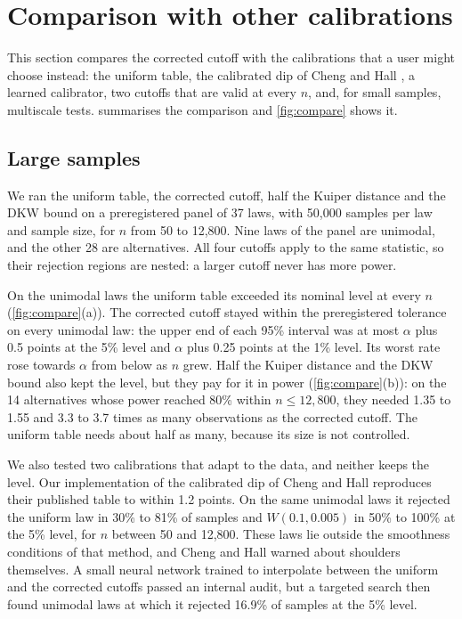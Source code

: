 \section{Comparison with other calibrations}\label{sec:practice}

This section compares the corrected cutoff with the calibrations that a user might choose instead: the uniform table, the calibrated dip of Cheng and Hall \cite{CH98}, a learned calibrator, two cutoffs that are valid at every $n$, and, for small samples, multiscale tests.  summarises the comparison and \cref{fig:compare} shows it.

\subsection{Large samples}
We ran the uniform table, the corrected cutoff, half the Kuiper distance and the DKW bound on a preregistered panel of 37 laws, with 50,000 samples per law and sample size, for $n$ from 50 to 12,800. Nine laws of the panel are unimodal, and the other 28 are alternatives. All four cutoffs apply to the same statistic, so their rejection regions are nested: a larger cutoff never has more power.

On the unimodal laws the uniform table exceeded its nominal level at every $n$ (\cref{fig:compare}(a)). The corrected cutoff stayed within the preregistered tolerance on every unimodal law: the upper end of each 95\% interval was at most $\alpha$ plus 0.5 points at the 5\% level and $\alpha$ plus 0.25 points at the 1\% level. Its worst rate rose towards $\alpha$ from below as $n$ grew. Half the Kuiper distance and the DKW bound also kept the level, but they pay for it in power (\cref{fig:compare}(b)): on the 14 alternatives whose power reached 80\% within $n\le12{,}800$, they needed 1.35 to 1.55 and 3.3 to 3.7 times as many observations as the corrected cutoff. The uniform table needs about half as many, because its size is not controlled.

We also tested two calibrations that adapt to the data, and neither keeps the level. Our implementation of the calibrated dip of Cheng and Hall \cite{CH98} reproduces their published table to within 1.2 points. On the same unimodal laws it rejected the uniform law in 30\% to 81\% of samples and $W(0.1,0.005)$ in 50\% to 100\% at the 5\% level, for $n$ between 50 and 12,800. These laws lie outside the smoothness conditions of that method, and Cheng and Hall \cite{CH99} warned about shoulders themselves. A small neural network trained to interpolate between the uniform and the corrected cutoffs passed an internal audit, but a targeted search then found unimodal laws at which it rejected 16.9\% of samples at the 5\% level.

